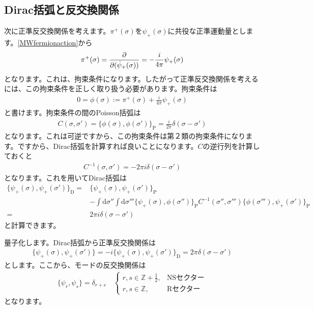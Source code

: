 \documentclass[report,paper=a4, fontsize=12pt, line_length=16cm, number_of_lines=33,dvipdfmx]{jlreq}
\numberwithin{equation}{chapter}
\numberwithin{equation}{section}
\newcommand{\Zb}{\mathbb{Z}}
\newcommand{\pbk}[1]{\{#1\}_{\mathrm{P}}}
\newcommand{\dbk}[1]{\{#1\}_{\mathrm{D}}}
\newcommand{\di}{\mathrm{d}}
\begin{document}
\subsection{Dirac括弧と反交換関係}
次に正準反交換関係を考えます。$\pi^{+}(\sigma)$を$\psi_{+}(\sigma)$に共役な正準運動量とします。\eqref{MWfermionaction}から
\begin{align}
  \pi^{+}(\sigma)=\pdv{(\dot{\psi}_{+}(\sigma))}=-\frac{i}{4\pi}\psi_{+}(\sigma)
\end{align}
となります。これは、拘束条件になります。したがって正準反交換関係を考えるには、この拘束条件を正しく取り扱う必要があります。拘束条件は
\begin{align}
  0=\phi(\sigma):=\pi^{+}(\sigma)+\frac{i}{4\pi}\psi_{+}(\sigma)
\end{align}
と書けます。拘束条件の間のPoisson括弧は
\begin{align}
  C(\sigma,\sigma')=\pbk{\phi(\sigma),\phi(\sigma')}=\frac{i}{2\pi}\delta(\sigma-\sigma')
\end{align}
となります。これは可逆ですから、この拘束条件は第２類の拘束条件になります。ですから、Dirac括弧を計算すれば良いことになります。$C$の逆行列を計算しておくと
\begin{align}
  C^{-1}(\sigma,\sigma')=-2\pi i\delta(\sigma-\sigma')
\end{align}
となります。これを用いてDirac括弧は
\begin{align}
  \dbk{\psi_{+}(\sigma),\psi_{+}(\sigma')}
  =&\pbk{\psi_{+}(\sigma),\psi_{+}(\sigma')}\nonumber \\
   &-\int \di\sigma''\int \di \sigma'''
   \pbk{\psi_{+}(\sigma),\phi(\sigma'')}C^{-1}(\sigma'',\sigma''')\pbk{\phi(\sigma'''),\psi_{+}(\sigma')}\nonumber\\
   =&2\pi i \delta(\sigma-\sigma')
\end{align}
と計算できます。

量子化します。Dirac括弧から正準反交換関係は
\begin{align}
  \{\psi_{+}(\sigma),\psi_{+}(\sigma')\}
  =-i\dbk{\psi_{+}(\sigma),\psi_{+}(\sigma')}
  =2\pi \delta(\sigma-\sigma')
\end{align}
とします。ここから、モードの反交換関係は
\begin{align}
  \{\psi_{r},\psi_{s}\}=\delta_{r+s}\quad
  \begin{cases}
    r,s\in \Zb+\frac12,&\text{NSセクター}\\
    r,s\in \Zb,&\text{Rセクター}
  \end{cases}
  \label{anticomm}
\end{align}
となります。
\end{document}
